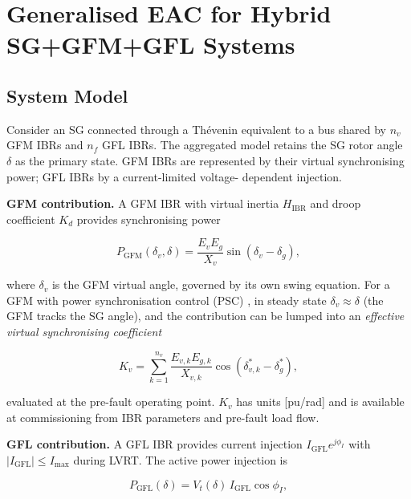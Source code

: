 \documentclass[11pt,a4paper]{article}
\newcommand{\Kv}{K_v}
\newcommand{\Hibr}{H_{\mathrm{IBR}}}
\begin{document}
\section{Generalised EAC for Hybrid SG+GFM+GFL Systems}
\label{sec:geac}

\subsection{System Model}
\label{sec:model}

Consider an SG connected through a Th\'evenin equivalent to a bus shared by
$n_v$ GFM IBRs and $n_f$ GFL IBRs.  The aggregated model retains the SG
rotor angle $\delta$ as the primary state.  GFM IBRs are represented by
their virtual synchronising power; GFL IBRs by a current-limited voltage-
dependent injection.

\textbf{GFM contribution.}  A GFM IBR with virtual inertia $\Hibr$ and
droop coefficient $K_d$ provides synchronising power

\begin{equation}
  P_{\mathrm{GFM}}(\delta_v, \delta)
  = \frac{E_v E_g}{X_v}\sin(\delta_v - \delta_g),
  \label{eq:P_GFM}
\end{equation}

where $\delta_v$ is the GFM virtual angle, governed by its own swing
equation.  For a GFM with power synchronisation control (PSC)
\cite{Wu2020GFM}, in steady state $\delta_v \approx \delta$ (the GFM
tracks the SG angle), and the contribution can be lumped into an
\emph{effective virtual synchronising coefficient}

\begin{equation}
  \Kv = \sum_{k=1}^{n_v} \frac{E_{v,k} E_{g,k}}{X_{v,k}}
        \cos(\delta_{v,k}^* - \delta_g^*),
  \label{eq:Kv}
\end{equation}

evaluated at the pre-fault operating point. $\Kv$ has units [pu/rad] and is
available at commissioning from IBR parameters and pre-fault load flow.

\textbf{GFL contribution.}  A GFL IBR provides current injection
$I_{\mathrm{GFL}} e^{j\phi_I}$ with $|I_{\mathrm{GFL}}| \leq I_{\max}$
during LVRT.  The active power injection is

\begin{equation}
  P_{\mathrm{GFL}}(\delta) = V_t(\delta)\,I_{\mathrm{GFL}}\cos\phi_I,
  \label{eq:P_GFL}
\end{equation}
\end{document}
